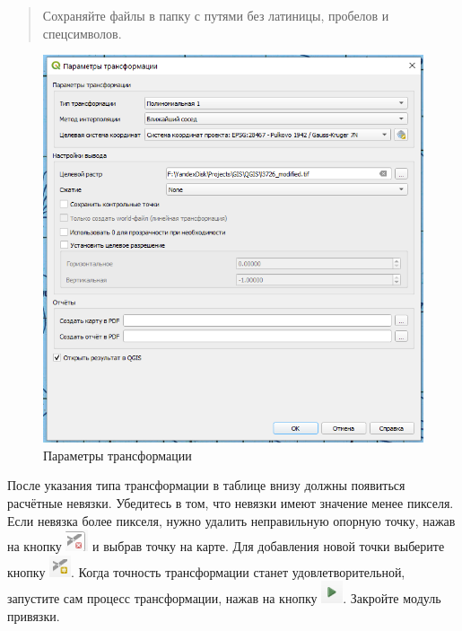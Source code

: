 \documentclass[
  12pt,
]{book}
\begin{document}
\begin{quote}
Сохраняйте файлы в папку с путями без латиницы, пробелов и спецсимволов.
\end{quote}

\begin{figure}
\centering
\includegraphics{images/Ref02/Transformation_parameters.png}
\caption{Параметры трансформации}
\end{figure}

После указания типа трансформации в таблице внизу должны появиться расчётные невязки. Убедитесь в том, что невязки имеют значение менее пикселя. Если невязка более пикселя, нужно удалить неправильную опорную точку, нажав на кнопку \includegraphics{images/Ref02/Delete_point.png} и выбрав точку на карте. Для добавления новой точки выберите кнопку \includegraphics{images/Ref02/Add_point.png}. Когда точность трансформации станет удовлетворительной, запустите сам процесс трансформации, нажав на кнопку \includegraphics{images/Ref02/Transformation_button.png}. Закройте модуль привязки.
\end{document}

